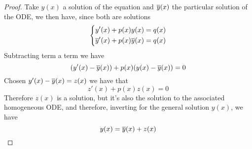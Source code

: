 \documentclass[../complete.tex]{subfiles}
\begin{document}
\begin{proof}
	Take $y(x)$ a solution of the equation and $\overline{y}(x)$ the particular solution of the ODE, we then have, since both are solutions
	\begin{equation*}
		\left\{ \begin{aligned}
				y'(x)+p(x)y(x)&=q(x)\\
				\overline{y}'(x)+p(x)\overline{y}(x)&=q(x)
		\end{aligned}\right.
	\end{equation*}
	Subtracting term a term we have
	\begin{equation*}
		(y'(x)-\overline{y}(x))+p(x)(y(x)-\overline{y}(x))=0
	\end{equation*}
	Chosen $y'(x)-\overline{y}(x)=z(x)$ we have that
	\begin{equation*}
		z'(x)+p(x)z(x)=0
	\end{equation*}
	Therefore $z(x)$ is a solution, but it's also the solution to the associated homogeneous ODE, and therefore, inverting for the general solution $y(x)$, we have
	\begin{equation*}
		y(x)=\overline{y}(x)+z(x)
	\end{equation*}
\end{proof}
\end{document}
